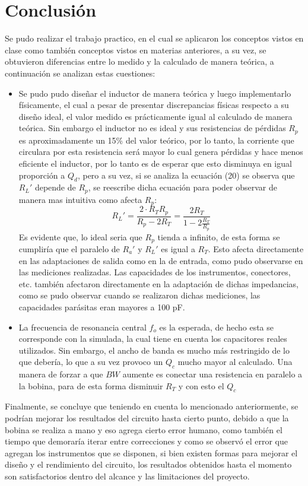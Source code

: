 \section{Conclusión}
Se pudo realizar el trabajo practico, en el cual se aplicaron los conceptos vistos en clase como también conceptos vistos en materias anteriores, a su vez, se obtuvieron diferencias entre lo medido y la calculado de manera teórica, a continuación se analizan estas cuestiones:
\begin{itemize}
    \item Se pudo pudo diseñar el inductor de manera teórica y luego implementarlo físicamente, el cual a pesar de presentar discrepancias físicas respecto a su diseño ideal, el valor medido es prácticamente igual al calculado de manera teórica. Sin embargo el inductor no es ideal y sus resistencias de pérdidas \(R_p\) es aproximadamente un 15\% del valor teórico, por lo tanto, la corriente que circulara por esta resistencia será mayor lo cual genera pérdidas y hace menos eficiente el inductor, por lo tanto es de esperar que esto disminuya en igual proporción a \(Q_d\), pero a su vez, si se analiza la ecuación (20) se observa que \(R_L'\) depende de \(R_p\), se reescribe dicha ecuación para poder observar de manera mas intuitiva como afecta \(R_p\):
    \begin{equation}
    R_L' = \frac{2\cdot R_TR_p}{R_p-2R_T} =  \frac{2R_T}{1-2\frac{R_T}{R_p}}
\end{equation}
Es evidente que, lo ideal seria que \(R_p\) tienda a infinito, de esta forma se cumpliría que el paralelo de \(R_a'\) y \(R_L'\) es igual a \(R_T\). Esto afecta directamente en las adaptaciones de salida como en la de entrada, como pudo observarse en las mediciones realizadas. Las capacidades de los instrumentos, conectores, etc. también afectaron directamente en la adaptación de dichas impedancias, como se pudo observar cuando se realizaron dichas mediciones, las capacidades parásitas eran mayores a 100 pF.
    \item La frecuencia de resonancia central \(f_o\) es la esperada, de hecho esta se corresponde con la simulada, la cual tiene en cuenta los capacitores reales utilizados. Sin embargo, el ancho de banda es mucho más restringido de lo que debería, lo que a su vez provoco un \(Q_c\) mucho mayor al calculado. Una manera de forzar a que \(BW\) aumente es conectar una resistencia en paralelo a la bobina, para de esta forma disminuir \(R_T\) y con esto el \(Q_c\)
\end{itemize}

Finalmente, se concluye que teniendo en cuenta lo mencionado anteriormente, se podrían mejorar los resultados del circuito hasta cierto punto, debido a que la bobina se realiza a mano y eso agrega cierto error humano, como también el tiempo que demoraría iterar entre correcciones y como se observó el error que agregan los instrumentos que se disponen, si bien existen formas para mejorar el diseño y el rendimiento del circuito, los resultados obtenidos hasta el momento son satisfactorios dentro del alcance y las limitaciones del proyecto.